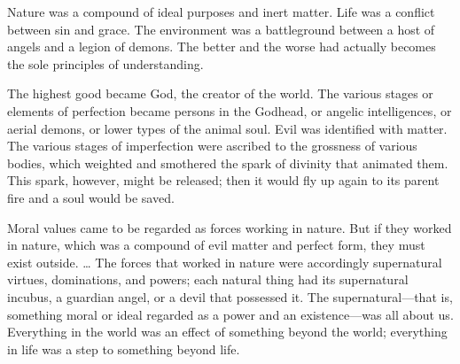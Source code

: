 \begin{quotex}
Nature was a compound of ideal purposes and inert matter. Life was a conflict between sin and grace. The environment was a battleground between a host of angels and a legion of demons. The better and the worse had actually becomes the sole principles of understanding. 

The highest good became God, the creator of the world. The various stages or elements of perfection became persons in the Godhead, or angelic intelligences, or aerial demons, or lower types of the animal soul. Evil was identified with matter. The various stages of imperfection were ascribed to the grossness of various bodies, which weighted and smothered the spark of divinity that animated them. This spark, however, might be released; then it would fly up again to its parent fire and a soul would be saved. 

Moral values came to be regarded as forces working in nature. But if they worked in nature, which was a compound of evil matter and perfect form, they must exist outside. … The forces that worked in nature were accordingly supernatural virtues, dominations, and powers; each natural thing had its supernatural incubus, a guardian angel, or a devil that possessed it. The supernatural—that is, something moral or ideal regarded as a power and an existence—was all about us. Everything in the world was an effect of something beyond the world; everything in life was a step to something beyond life. 
\end{quotex}

